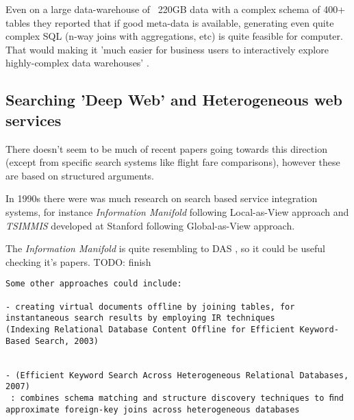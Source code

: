\documentclass[a4paper,11pt,draft]{article}
\begin{document}
Even on a large data-warehouse of ~220GB data with a complex schema of 400+ tables they reported that if good meta-data is available, generating even quite complex SQL  (n-way joins with aggregations, etc) is quite feasible for computer. That would making it 'much easier for business users to interactively explore highly-complex data warehouses' \cite[p.932]{ethz2012}. 












\subsection{Searching 'Deep Web' and Heterogeneous web services}
{\color{red}There doesn't seem to be much of recent papers going towards this direction (except from specific search systems like flight fare comparisons), however these are based on structured arguments.} 

In 1990s there were was much research on search based service integration systems, for instance \textit{Information Manifold} following Local-as-View approach and \textit{TSIMMIS} developed at Stanford following Global-as-View approach. 

The \textit{Information Manifold} is quite resembling to DAS {\color{red},  so it could be useful checking it's papers. TODO: finish}



\begin{verbatim}
Some other approaches could include: 

- creating virtual documents offline by joining tables, for instantaneous search results by employing IR techniques
(Indexing Relational Database Content Offline for Efficient Keyword-Based Search, 2003)


- (Efficient Keyword Search Across Heterogeneous Relational Databases, 2007)
 : combines schema matching and structure discovery techniques to ﬁnd approximate foreign-key joins across heterogeneous databases
\end{verbatim}
\end{document}
